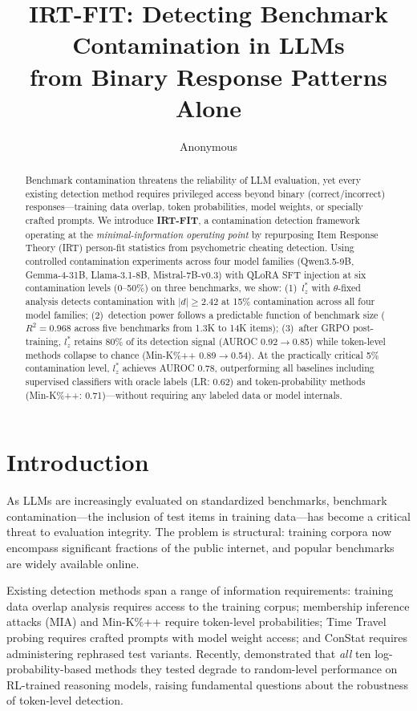 \documentclass[11pt,a4paper]{article}
\title{IRT-FIT: Detecting Benchmark Contamination in LLMs\\from Binary Response Patterns Alone}
\author{Anonymous}
\date{}
\newcommand{\lzstar}{$l_{z}^{*}$}
\newcommand{\thetafix}{$\theta$-fixed}
\begin{document}
\maketitle

\begin{abstract}
Benchmark contamination threatens the reliability of LLM evaluation, yet every existing detection method requires privileged access beyond binary (correct/incorrect) responses---training data overlap, token probabilities, model weights, or specially crafted prompts.
We introduce \textbf{IRT-FIT}, a contamination detection framework operating at the \emph{minimal-information operating point} by repurposing Item Response Theory (IRT) person-fit statistics from psychometric cheating detection.
Using controlled contamination experiments across four model families (Qwen3.5-9B, Gemma-4-31B, Llama-3.1-8B, Mistral-7B-v0.3) with QLoRA SFT injection at six contamination levels (0--50\%) on three benchmarks, we show:
(1)~\lzstar{} with \thetafix{} analysis detects contamination with $|d| \geq 2.42$ at 15\% contamination across all four model families;
(2)~detection power follows a predictable function of benchmark size ($R^2=0.968$ across five benchmarks from 1.3K to 14K items);
(3)~after GRPO post-training, \lzstar{} retains 80\% of its detection signal (AUROC 0.92$\to$0.85) while token-level methods collapse to chance (Min-K\%++ 0.89$\to$0.54).
At the practically critical 5\% contamination level, \lzstar{} achieves AUROC 0.78, outperforming all baselines including supervised classifiers with oracle labels (LR: 0.62) and token-probability methods (Min-K\%++: 0.71)---without requiring any labeled data or model internals.
\end{abstract}

\section{Introduction}
\label{sec:intro}

As LLMs are increasingly evaluated on standardized benchmarks, benchmark contamination---the inclusion of test items in training data---has become a critical threat to evaluation integrity.
The problem is structural: training corpora now encompass significant fractions of the public internet, and popular benchmarks are widely available online.

Existing detection methods span a range of information requirements: training data overlap analysis requires access to the training corpus; membership inference attacks (MIA) and Min-K\%++ \citep{shi2024detecting} require token-level probabilities; Time Travel probing \citep{oren2024proving} requires crafted prompts with model weight access; and ConStat \citep{dekoninck2024constat} requires administering rephrased test variants.
Recently, \citet{wang2025rlcontam} demonstrated that \emph{all} ten log-probability-based methods they tested degrade to random-level performance on RL-trained reasoning models, raising fundamental questions about the robustness of token-level detection.
\end{document}
